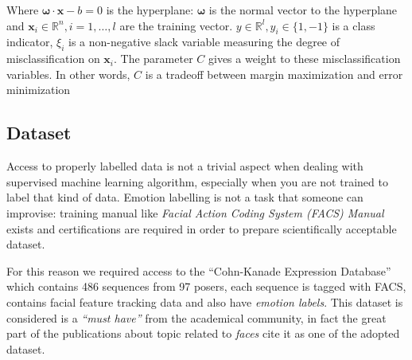  Where $\boldsymbol{\omega} \cdot \textbf{x} - b = 0$ is the hyperplane:
 $\boldsymbol{\omega}$ is the normal vector to the hyperplane and $\textbf{x}_i
 \in \mathbb{R}^n, i = 1,\dots,l$ are the training vector.  $y \in \mathbb{R}^l,
 y_i \in \{1, -1\}$ is a class indicator, $\xi_i$ is a non-negative slack
 variable measuring the degree of misclassification on $\textbf{x}_i$. The
 parameter $C$ gives a weight to these misclassification variables. In other
 words, $C$ is a tradeoff between margin maximization and error minimization

\subsection{Dataset}

Access to properly labelled data is not a trivial aspect when dealing with supervised machine learning algorithm, especially when you are not trained to label that kind of data. Emotion labelling is not a task that someone can improvise: training manual like \emph{Facial Action Coding System (FACS) Manual} exists and certifications are required in order to prepare scientifically acceptable dataset.
 
For this reason we required access to the ``Cohn-Kanade Expression Database''\cite{Kanade2000} which contains 486 sequences from 97 posers, each sequence is tagged with FACS, contains facial feature tracking data and also have \emph{emotion labels}. This dataset is considered is a \emph{``must have''} from the academical community, in fact the great part of the publications about topic related to \emph{faces} cite it as one of the adopted dataset.



